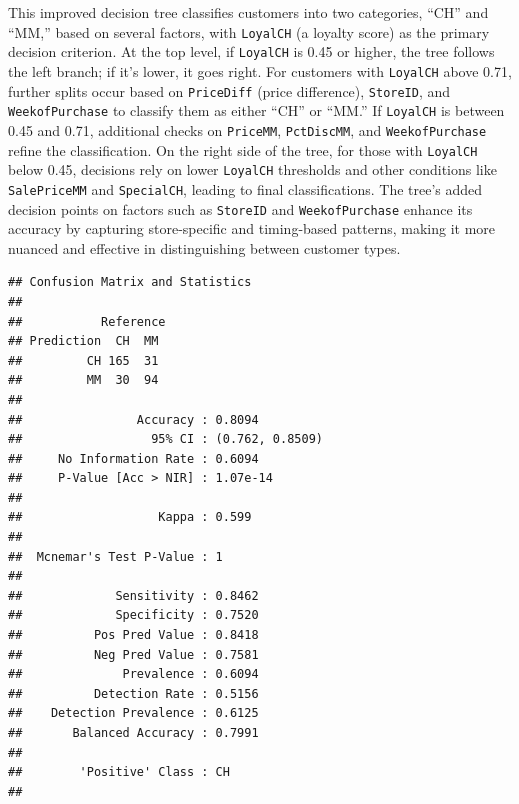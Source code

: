 \documentclass[
]{article}
\newenvironment{Shaded}{\begin{snugshade}}{\end{snugshade}}
\newcommand{\AttributeTok}[1]{\textcolor[rgb]{0.13,0.29,0.53}{#1}}
\newcommand{\FunctionTok}[1]{\textcolor[rgb]{0.13,0.29,0.53}{\textbf{#1}}}
\newcommand{\NormalTok}[1]{#1}
\newcommand{\OtherTok}[1]{\textcolor[rgb]{0.56,0.35,0.01}{#1}}
\newcommand{\SpecialCharTok}[1]{\textcolor[rgb]{0.81,0.36,0.00}{\textbf{#1}}}
\newcommand{\StringTok}[1]{\textcolor[rgb]{0.31,0.60,0.02}{#1}}
\begin{document}
This improved decision tree classifies customers into two categories,
``CH'' and ``MM,'' based on several factors, with \texttt{LoyalCH} (a
loyalty score) as the primary decision criterion. At the top level, if
\texttt{LoyalCH} is 0.45 or higher, the tree follows the left branch; if
it's lower, it goes right. For customers with \texttt{LoyalCH} above
0.71, further splits occur based on \texttt{PriceDiff} (price
difference), \texttt{StoreID}, and \texttt{WeekofPurchase} to classify
them as either ``CH'' or ``MM.'' If \texttt{LoyalCH} is between 0.45 and
0.71, additional checks on \texttt{PriceMM}, \texttt{PctDiscMM}, and
\texttt{WeekofPurchase} refine the classification. On the right side of
the tree, for those with \texttt{LoyalCH} below 0.45, decisions rely on
lower \texttt{LoyalCH} thresholds and other conditions like
\texttt{SalePriceMM} and \texttt{SpecialCH}, leading to final
classifications. The tree's added decision points on factors such as
\texttt{StoreID} and \texttt{WeekofPurchase} enhance its accuracy by
capturing store-specific and timing-based patterns, making it more
nuanced and effective in distinguishing between customer types.

\begin{Shaded}
\end{Shaded}

\begin{verbatim}
## Confusion Matrix and Statistics
## 
##           Reference
## Prediction  CH  MM
##         CH 165  31
##         MM  30  94
##                                          
##                Accuracy : 0.8094         
##                  95% CI : (0.762, 0.8509)
##     No Information Rate : 0.6094         
##     P-Value [Acc > NIR] : 1.07e-14       
##                                          
##                   Kappa : 0.599          
##                                          
##  Mcnemar's Test P-Value : 1              
##                                          
##             Sensitivity : 0.8462         
##             Specificity : 0.7520         
##          Pos Pred Value : 0.8418         
##          Neg Pred Value : 0.7581         
##              Prevalence : 0.6094         
##          Detection Rate : 0.5156         
##    Detection Prevalence : 0.6125         
##       Balanced Accuracy : 0.7991         
##                                          
##        'Positive' Class : CH             
## 
\end{verbatim}
\end{document}
